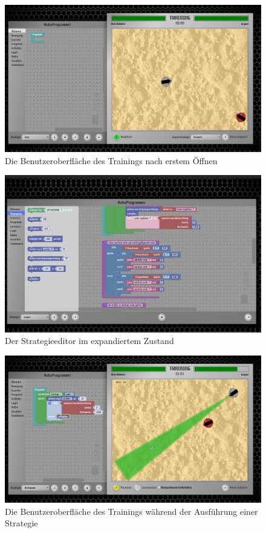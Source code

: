 \begin{figure}
  \centering
  \label{training}
  \includegraphics[width=15cm, keepaspectratio]{figures/3-training.png}
  \caption{Die Benutzeroberfläche des Trainings nach erstem Öffnen}
\end{figure}

\begin{figure}
  \centering
  \label{training-expanded}
  \includegraphics[width=15cm, keepaspectratio]{figures/4-training-expanded.png}
  \caption{Der Strategieeditor im expandiertem Zustand}
\end{figure}

\begin{figure}
  \centering
  \label{training-run}
  \includegraphics[width=15cm, keepaspectratio]{figures/3-training-run.png}
  \caption{Die Benutzeroberfläche des Trainings während der Ausführung einer Strategie}
\end{figure}


